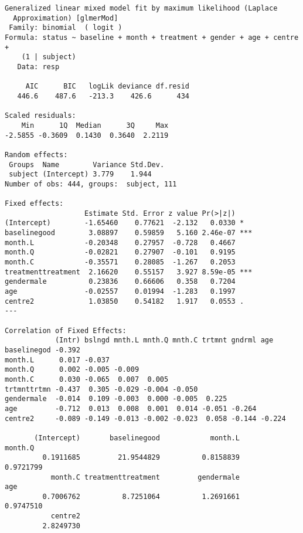 \documentclass[12pt,fleqn]{article}\usepackage{../common}
\begin{document}
\begin{verbatim}
Generalized linear mixed model fit by maximum likelihood (Laplace
  Approximation) [glmerMod]
 Family: binomial  ( logit )
Formula: status ~ baseline + month + treatment + gender + age + centre +  
    (1 | subject)
   Data: resp

     AIC      BIC   logLik deviance df.resid 
   446.6    487.6   -213.3    426.6      434 

Scaled residuals: 
    Min      1Q  Median      3Q     Max 
-2.5855 -0.3609  0.1430  0.3640  2.2119 

Random effects:
 Groups  Name        Variance Std.Dev.
 subject (Intercept) 3.779    1.944   
Number of obs: 444, groups:  subject, 111

Fixed effects:
                   Estimate Std. Error z value Pr(>|z|)    
(Intercept)        -1.65460    0.77621  -2.132   0.0330 *  
baselinegood        3.08897    0.59859   5.160 2.46e-07 ***
month.L            -0.20348    0.27957  -0.728   0.4667    
month.Q            -0.02821    0.27907  -0.101   0.9195    
month.C            -0.35571    0.28085  -1.267   0.2053    
treatmenttreatment  2.16620    0.55157   3.927 8.59e-05 ***
gendermale          0.23836    0.66606   0.358   0.7204    
age                -0.02557    0.01994  -1.283   0.1997    
centre2             1.03850    0.54182   1.917   0.0553 .  
---

Correlation of Fixed Effects:
            (Intr) bslngd mnth.L mnth.Q mnth.C trtmnt gndrml age   
baselinegod -0.392                                                 
month.L      0.017 -0.037                                          
month.Q      0.002 -0.005 -0.009                                   
month.C      0.030 -0.065  0.007  0.005                            
trtmnttrtmn -0.437  0.305 -0.029 -0.004 -0.050                     
gendermale  -0.014  0.109 -0.003  0.000 -0.005  0.225              
age         -0.712  0.013  0.008  0.001  0.014 -0.051 -0.264       
centre2     -0.089 -0.149 -0.013 -0.002 -0.023  0.058 -0.144 -0.224

       (Intercept)       baselinegood            month.L            month.Q 
         0.1911685         21.9544829          0.8158839          0.9721799 
           month.C treatmenttreatment         gendermale                age 
         0.7006762          8.7251064          1.2691661          0.9747510 
           centre2 
         2.8249730 

\end{verbatim}
\end{document}
